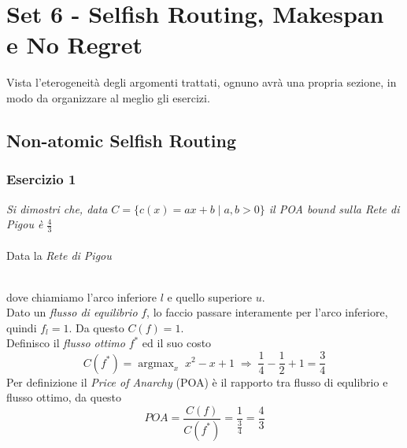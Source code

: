 \documentclass{article}
\DeclareMathOperator*{\argmax}{argmax}
\begin{document}
    \section{Set 6 - Selfish Routing, Makespan e No Regret}
        Vista l'eterogeneità degli argomenti trattati, ognuno avrà una propria sezione, in modo da organizzare al meglio gli esercizi.
        \subsection{Non-atomic Selfish Routing}
            \subsubsection{Esercizio 1}
                \textit{Si dimostri che, data $ C = \{ c(x) = ax + b\; \vert\; a,b > 0 \} $ il POA bound sulla Rete di Pigou è $ \frac{4}{3} $}\\
                \\
                Data la \textit{Rete di Pigou}
                \begin{figure}[htb]\hspace*{\fill}%
                    \hspace*{\fill}
                \end{figure}\\
                dove chiamiamo l'arco inferiore $ l $ e quello superiore $ u $.\\
                Dato un \textit{flusso di equilibrio} $ f $, lo faccio passare interamente per l'arco inferiore, quindi $ f_l = 1 $. Da questo $ C(f) = 1 $.\\
                Definisco il \textit{flusso ottimo} $ f^* $ ed il suo costo
                \[
                    C(f^*) = \argmax_x\; x^2 - x + 1\; \Rightarrow\; \frac{1}{4} - \frac{1}{2} + 1 = \frac{3}{4}   
                \]
                Per definizione il \textit{Price of Anarchy} (POA) è il rapporto tra flusso di equlibrio e flusso ottimo, da questo
                \[
                    POA = \frac{C(f)}{C(f^*)} = \frac{1}{\frac{3}{4}} = \frac{4}{3}    
                \]
            \newpage
\end{document}
